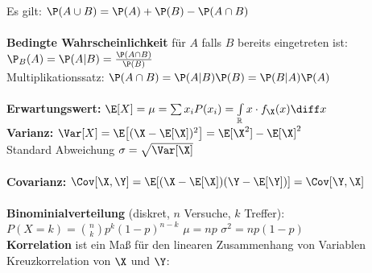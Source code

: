 \documentclass[fs, footer]{latex4ei}
\begin{document}
\begin{multicols*}{4}
{Es gilt: $\P(A \cup B) = \P(A) + \P(B) - \P(A \cap B)$\\ \\
\textbf{Bedingte Wahrscheinlichkeit} für $A$ falls $B$ bereits eingetreten ist:\\
$\P_B(A) = \P(A|B) = \frac{\P(A \cap B)}{\P(B)}$\\
Multiplikationssatz: $\P(A \cap B) = \P(A|B)\P(B) = \P(B|A)\P(A)$\\
\\
\textbf{Erwartungswert:} $\E[X] = \mu = \sum x_i P(x_i) = \int \limits_\mathbb R x \cdot f_{\X} (x) \diff x$ \\ 
\textbf{Varianz:} $\Var [X] = \E \big[(\X - \E[\X])^2\big] = \E[\X^2] - \E[\X]^2$\\
Standard Abweichung $\sigma = \sqrt{\Var[\X]}$\\
\\
\textbf{Covarianz:} $\Cov [\X,\Y] = \E[(\X- \E[\X])(\Y - \E[\Y])] = \Cov [\Y, \X]$\\
\\
	\textbf{Binominialverteilung} (diskret, $n$ Versuche, $k$ Treffer): \\
	$P(X=k)= \binom nk p^k (1-p)^{n-k}$ \quad $\mu = np$ \quad $\sigma^2 = np(1-p)$\\

	\textbf{Korrelation} ist ein Maß für den linearen Zusammenhang von Variablen\\
	Kreuzkorrelation von $\X$ und $\Y$: \\	
}




\end{multicols*}
\end{document}
